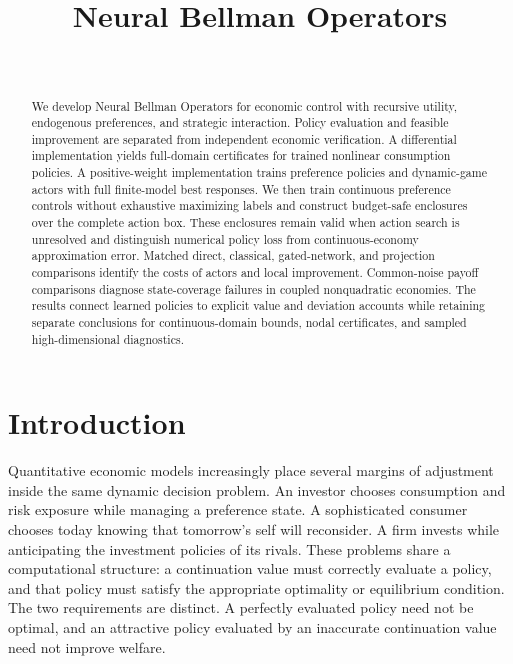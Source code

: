 \documentclass[ecta,draft]{econsocart}
\theoremstyle{definition}
\theoremstyle{remark}
\begin{document}
\begin{frontmatter}
\title{Neural Bellman Operators}
\begin{aug}
\author[id=au1,addressref={add1}]{~}
\address[id=add1]{Peking University}
\end{aug}
\begin{abstract}
We develop Neural Bellman Operators for economic control with recursive utility, endogenous preferences, and strategic interaction. Policy evaluation and feasible improvement are separated from independent economic verification. A differential implementation yields full-domain certificates for trained nonlinear consumption policies. A positive-weight implementation trains preference policies and dynamic-game actors with full finite-model best responses. We then train continuous preference controls without exhaustive maximizing labels and construct budget-safe enclosures over the complete action box. These enclosures remain valid when action search is unresolved and distinguish numerical policy loss from continuous-economy approximation error. Matched direct, classical, gated-network, and projection comparisons identify the costs of actors and local improvement. Common-noise payoff comparisons diagnose state-coverage failures in coupled nonquadratic economies. The results connect learned policies to explicit value and deviation accounts while retaining separate conclusions for continuous-domain bounds, nodal certificates, and sampled high-dimensional diagnostics.
\end{abstract}
\begin{keyword}
\end{keyword}
\end{frontmatter}

\section{Introduction}\label{sec:introduction}
Quantitative economic models increasingly place several margins of adjustment inside the same dynamic decision problem. An investor chooses consumption and risk exposure while managing a preference state. A sophisticated consumer chooses today knowing that tomorrow's self will reconsider. A firm invests while anticipating the investment policies of its rivals. These problems share a computational structure: a continuation value must correctly evaluate a policy, and that policy must satisfy the appropriate optimality or equilibrium condition. The two requirements are distinct. A perfectly evaluated policy need not be optimal, and an attractive policy evaluated by an inaccurate continuation value need not improve welfare.
\end{document}
